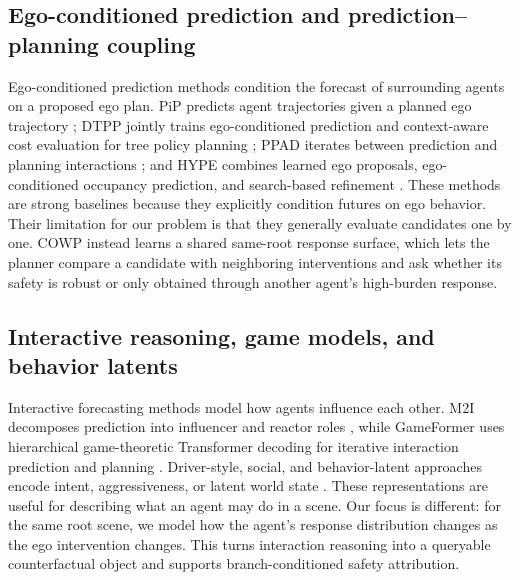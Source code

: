 \documentclass[10pt]{article}
\newcommand{\framework}{COWP}
\begin{document}
\subsection{Ego-conditioned prediction and prediction--planning coupling}
Ego-conditioned prediction methods condition the forecast of surrounding agents on a proposed ego plan. PiP predicts agent trajectories given a planned ego trajectory \parencite{song2020pip}; DTPP jointly trains ego-conditioned prediction and context-aware cost evaluation for tree policy planning \parencite{huang2024dtpp}; PPAD iterates between prediction and planning interactions \parencite{chen2024ppad}; and HYPE combines learned ego proposals, ego-conditioned occupancy prediction, and search-based refinement \parencite{yu2025hype}. These methods are strong baselines because they explicitly condition futures on ego behavior. Their limitation for our problem is that they generally evaluate candidates one by one. \framework{} instead learns a shared same-root response surface, which lets the planner compare a candidate with neighboring interventions and ask whether its safety is robust or only obtained through another agent's high-burden response.

\subsection{Interactive reasoning, game models, and behavior latents}
Interactive forecasting methods model how agents influence each other. M2I decomposes prediction into influencer and reactor roles \parencite{sun2022m2i}, while GameFormer uses hierarchical game-theoretic Transformer decoding for iterative interaction prediction and planning \parencite{huang2023gameformer}. Driver-style, social, and behavior-latent approaches encode intent, aggressiveness, or latent world state \parencite{hu2023formulating,chen2025categorical,deng2025social,hao2026styledrive,zheng2025world4drive}. These representations are useful for describing what an agent may do in a scene. Our focus is different: for the same root scene, we model how the agent's response distribution changes as the ego intervention changes. This turns interaction reasoning into a queryable counterfactual object and supports branch-conditioned safety attribution.
\end{document}
